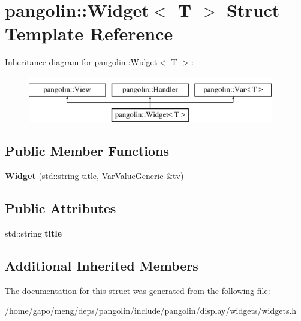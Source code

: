 \hypertarget{structpangolin_1_1_widget}{}\section{pangolin\+:\+:Widget$<$ T $>$ Struct Template Reference}
\label{structpangolin_1_1_widget}
Inheritance diagram for pangolin\+:\+:Widget$<$ T $>$\+:\begin{figure}[H]
\begin{center}
\leavevmode
\includegraphics[height=2.000000cm]{structpangolin_1_1_widget}
\end{center}
\end{figure}
\subsection*{Public Member Functions}
\begin{DoxyCompactItemize}
\item 
{\bfseries Widget} (std\+::string title, \hyperlink{classpangolin_1_1_var_value_generic}{Var\+Value\+Generic} \&tv)\hypertarget{structpangolin_1_1_widget_a7ed8a0ae71839640fa5bf834f1bfcc13}{}\label{structpangolin_1_1_widget_a7ed8a0ae71839640fa5bf834f1bfcc13}

\end{DoxyCompactItemize}
\subsection*{Public Attributes}
\begin{DoxyCompactItemize}
\item 
std\+::string {\bfseries title}\hypertarget{structpangolin_1_1_widget_afa6edce37143c297f610722e5a886c45}{}\label{structpangolin_1_1_widget_afa6edce37143c297f610722e5a886c45}

\end{DoxyCompactItemize}
\subsection*{Additional Inherited Members}


The documentation for this struct was generated from the following file\+:\begin{DoxyCompactItemize}
\item 
/home/gapo/meng/deps/pangolin/include/pangolin/display/widgets/widgets.\+h\end{DoxyCompactItemize}
